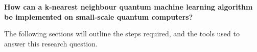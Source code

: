 \centering\textbf{How can a k-nearest neighbour quantum machine learning algorithm be implemented on small-scale quantum computers?}


\justify
The following sections will outline the steps required, and the tools used to answer this research question. 
